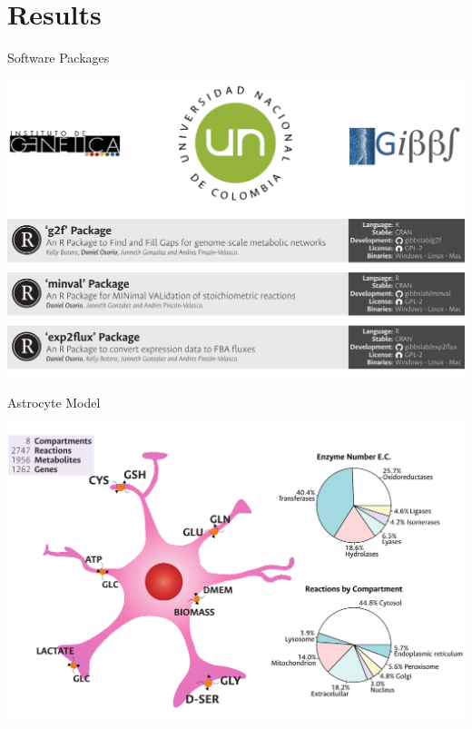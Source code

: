 \documentclass[11pt]{beamer}
\begin{document}
\section{Results}
\begin{frame}{Software Packages}
\begin{center}
\includegraphics[width=\textwidth]{SPackages}
\end{center}
\end{frame}
\begin{frame}{Astrocyte Model}
\begin{center}
\includegraphics[width=\textwidth]{Astrocyte}
\end{center}
\end{frame}
\end{document}
